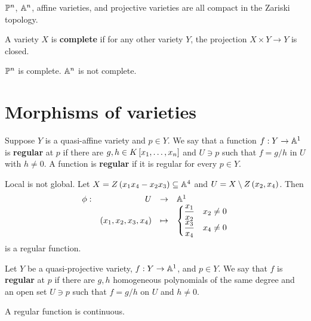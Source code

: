 \begin{corollary}
$ \P^n $, $ \A^n $, affine varieties, and projective varieties are all compact in the Zariski topology.
\end{corollary}

\begin{definition}
A variety $ X $ is \textbf{complete} if for any other variety $ Y $, the projection $ X \times Y \to Y $ is closed.
\end{definition}

\begin{example}
$ \P^n $ is complete. $ \A^n $ is not complete.
\end{example}

\pagebreak

\section{Morphisms of varieties}

\begin{definition}
Suppose $ Y $ is a quasi-affine variety and $ p \in Y $. We say that a function $ f : Y \to \A^1 $ is \textbf{regular} at $ p $ if there are $ g, h \in K\sb{x_1, \dots, x_n} $ and $ U \ni p $ such that $ f = g / h $ in $ U $ with $ h \ne 0 $. A function is \textbf{regular} if it is regular for every $ p \in Y $.
\end{definition}

\begin{example}
Local is not global. Let $ X = Z\rb{x_1x_4 - x_2x_3} \subseteq \A^4 $ and $ U = X \setminus Z\rb{x_2, x_4} $. Then
$$ \function[\phi]{U}{\A^1}{\rb{x_1, x_2, x_3, x_4}}{
\begin{cases}
\dfrac{x_1}{x_2} & x_2 \ne 0 \\
\dfrac{x_3}{x_4} & x_4 \ne 0
\end{cases}
} $$
is a regular function.
\end{example}

\begin{definition}
Let $ Y $ be a quasi-projective variety, $ f : Y \to \A^1 $, and $ p \in Y $. We say that $ f $ is \textbf{regular} at $ p $ if there are $ g, h $ homogeneous polynomials of the same degree and an open set $ U \ni p $ such that $ f = g / h $ on $ U $ and $ h \ne 0 $.
\end{definition}

\begin{lemma}
A regular function is continuous.
\end{lemma}

